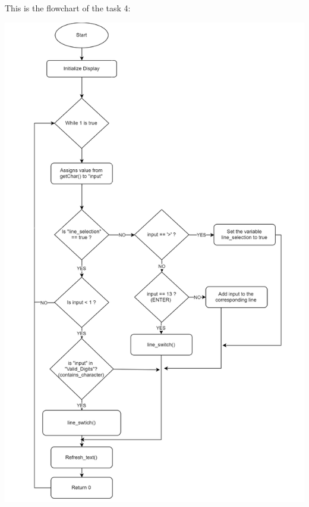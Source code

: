 \documentclass[a4paper,12pt]{article}
\begin{document}
This is the flowchart of the task 4:
\begin{center}
\includegraphics[scale=0.5]{img/Task4.png}
\end{center}
\end{document}
